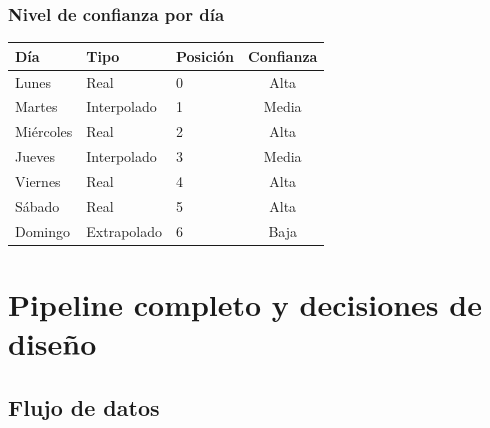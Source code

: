\documentclass[12pt,a4paper]{article}
\begin{document}
\subsubsection{Nivel de confianza por día}

\begin{center}
\begin{tabular}{lllc}
  \toprule
  Día & Tipo & Posición & Confianza \\
  \midrule
  Lunes     & Real         & 0 & Alta \\
  Martes    & Interpolado  & 1 & Media \\
  Miércoles & Real         & 2 & Alta \\
  Jueves    & Interpolado  & 3 & Media \\
  Viernes   & Real         & 4 & Alta \\
  Sábado    & Real         & 5 & Alta \\
  Domingo   & Extrapolado  & 6 & Baja \\
  \bottomrule
\end{tabular}
\end{center}

\section{Pipeline completo y decisiones de diseño}

\subsection{Flujo de datos}
\end{document}
